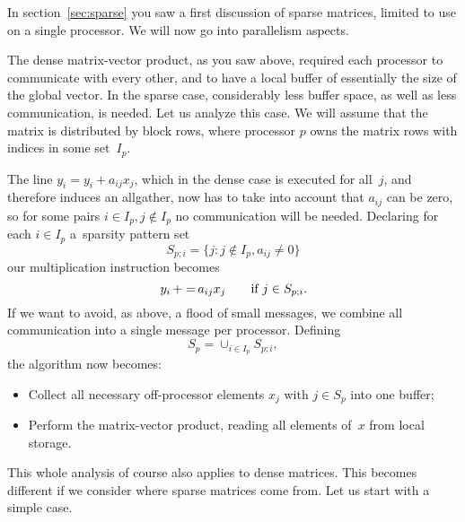 
In section~\ref{sec:sparse} you saw a first discussion of sparse
matrices, limited to use on a single processor. We will now go into
parallelism aspects.

The dense matrix-vector product, as you saw above,
required each processor to communicate with every other, and to have a
local buffer of essentially the size of the global vector. In the
sparse case, considerably less buffer space, as well as less
communication, is needed. Let us analyze this case. We will assume
that the matrix is distributed by block rows, where processor $p$ owns
the matrix rows with indices in some set~$I_p$.

The line $y_i=y_i+a_{ij}x_j$,
which in the dense case is executed for all~$j$,
and therefore induces an allgather,
now has to take into account that $a_{ij}$
can be zero,
so for some pairs $i\in I_p, j\not\in I_p$
no communication will be needed.
Declaring
for each $i\in I_p$ a~sparsity pattern set
\[ S_{p;i}=\{j\colon j\not\in I_p, a_{ij}\not=0\} \]
our multiplication instruction becomes
\[ y_i\mathop{+=}a_{ij}x_j\qquad\hbox{if $j\in S_{p;i}$}. \]
If we want to avoid, as above, a flood of small messages, we combine
all communication into a single message per processor. Defining
\[ S_p = \cup_{i\in I_p} S_{p;i}, \]
the algorithm now becomes:
\begin{itemize}
\item Collect all necessary off-processor elements $x_j$ with $j\in
  S_p$ into one buffer;
\item Perform the matrix-vector product, reading all elements of~$x$
  from local storage.
\end{itemize}

This whole analysis of course also applies to dense matrices. This
becomes different if we consider where sparse matrices come from.  Let
us start with a simple case.

